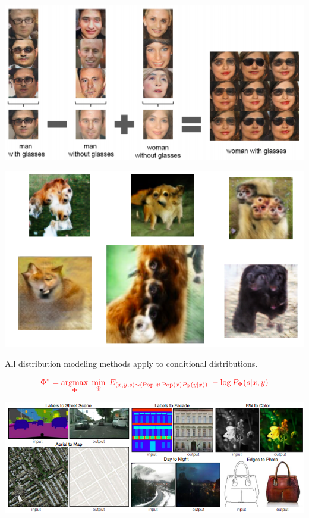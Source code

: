 {

\centerline{\includegraphics[width = 9in]{../images/ImageFeatures}}


\centerline{\includegraphics[width = 9in]{../images/BadGAN}}



All distribution modeling methods apply to conditional distributions.

$${\color{red} \Phi^* = \operatorname*{argmax}_\Phi \; \min_\Psi \;E_{(x,y,s) \sim (\mathrm{Pop}\; \uplus \;\mathrm{Pop}(x)P_\Phi(y|x))}\;-\log P_\Psi(s|x,y)}$$


\centerline{\includegraphics[width = 8.0in]{../images/cGAN0}}

}
